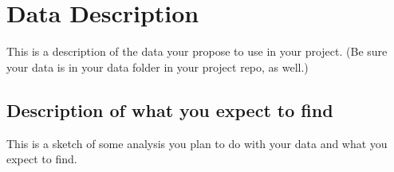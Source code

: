 \documentclass[manuscript,authorversion,nonacm]{acmart} %
\begin{document}


\section{Data Description}

This is a description of the data your propose to use in your project. (Be sure your data is in your data folder in your project repo, as well.)

\subsection{Description of what you expect to find} 

This is a sketch of some analysis you plan to do with your data and what you expect to find.


\newpage




\newpage 
\appendix
\end{document}
